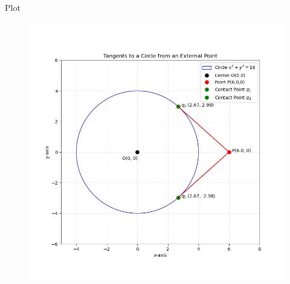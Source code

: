 \documentclass{beamer}
\begin{document}
\begin{frame}{Plot}
\begin{figure}[H]
	\centering
	\includegraphics[width=0.85\linewidth]{figs/tangents_plot}
	\caption{}
	\label{fig:tangentsplot}
\end{figure}

\end{frame}
\end{document}
